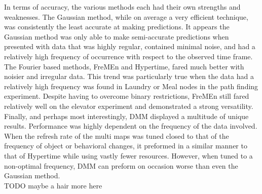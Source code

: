 In terms of accuracy, the various methods each had their own strengths and
weaknesses. The Gaussian method, while on average a very efficient
technique, was consistently the least accurate at making predictions. It appears the
Gaussian method was only able to make semi-accurate predictions when presented
with data that was highly regular, contained minimal noise, and had a
relatively high frequency of occurrence with respect to the observed time
frame. \\

The Fourier based methods, FreMEn and Hypertime, fared much better
with noisier and irregular data. This trend was particularly true when the data
had a relatively high frequency was found in Laundry or Meal nodes in the
path finding experiment. Despite having to overcome binary restrictions, FreMEn
still fared relatively well on the elevator experiment and demonstrated a strong
versatility. Finally, and perhaps most interestingly, DMM
displayed a multitude of unique results. Performance was highly dependent
on the frequency of the data involved. When the refresh rate of the multi maps
was tuned closed to that of the frequency of object or behavioral changes, it
preformed in a similar manner to that of Hypertime while using vastly fewer
resources. However, when tuned to a non-optimal frequency, DMM can preform
on occasion worse than even the Gaussian method. \\ TODO maybe a hair more here


